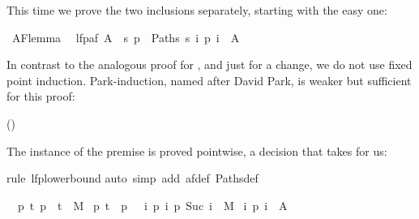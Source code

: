 \begin{isabellebody}
\begin{isamarkuptext}
This time we prove the two inclusions separately, starting
with the easy one:%
\end{isamarkuptext}%
\isamarkuptrue%
\isamarkupfalse%
\ AF{\isacharunderscore}lemma{}{\isacharcolon}\isanewline
\ \ {\isachardoublequoteopen}lfp{\isacharparenleft}af\ A{\isacharparenright}\ {\isasymsubseteq}\ {\isacharbraceleft}s{\isachardot}\ {\isasymforall}p\ {\isasymin}\ Paths\ s{\isachardot}\ {\isasymexists}i{\isachardot}\ p\ i\ {\isasymin}\ A{\isacharbraceright}{\isachardoublequoteclose}%
\isadelimproof
%
\endisadelimproof
%
\isatagproof
%
\begin{isamarkuptxt}%
\noindent
In contrast to the analogous proof for , and just
for a change, we do not use fixed point induction.  Park-induction,
named after David Park, is weaker but sufficient for this proof:
\begin{center}
 \hfill ()
\end{center}
The instance of the premise  is proved pointwise,
a decision that  takes for us:%
\end{isamarkuptxt}%
\isamarkuptrue%
\isamarkupfalse%
{\isacharparenleft}rule\ lfp{\isacharunderscore}lowerbound{\isacharparenright}\isanewline
{}\isamarkupfalse%
{\isacharparenleft}auto\ simp\ add{\isacharcolon}\ af{\isacharunderscore}def\ Paths{\isacharunderscore}def{\isacharparenright}%
\begin{isamarkuptxt}%
\begin{isabelle}%
\ {}{\isachardot}\ {\isasymAnd}p{\isachardot}\ {\isasymlbrakk}{\isasymforall}t{\isachardot}\ {\isacharparenleft}p\ {}{\isacharcomma}\ t{\isacharparenright}\ {\isasymin}\ M\ {\isasymlongrightarrow}\isanewline
{}p{\isachardot}\ t\ {\isacharequal}\ p\ {}\ {\isasymand}\ {\isacharparenleft}{\isasymforall}i{\isachardot}\ {\isacharparenleft}p\ i{\isacharcomma}\ p\ {\isacharparenleft}Suc\ i{\isacharparenright}{\isacharparenright}\ {\isasymin}\ M{\isacharparenright}\ {\isasymlongrightarrow}\isanewline
{}i{\isachardot}\ p\ i\ {\isasymin}\ A{\isacharparenright}{\isacharparenright}{\isacharsemicolon}\isanewline

\end{isabelle}
\end{isamarkuptxt}
\end{isabellebody}
